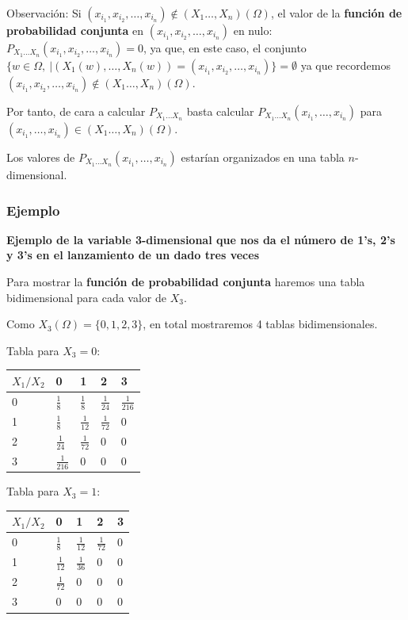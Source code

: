 \documentclass[]{book}
\begin{document}
Observación:
Si \((x_{i_1},x_{i_2},\ldots,x_{i_n})\not\in (X_1\ldots,X_n)(\Omega)\), el valor de la \textbf{función de probabilidad conjunta} en \((x_{i_1},x_{i_2},\ldots,x_{i_n})\) en nulo: \(P_{X_1\ldots X_n}(x_{i_1},x_{i_2},\ldots,x_{i_n})=0\), ya que, en este caso, el conjunto \(\{w\in\Omega,\ | (X_1(w),\ldots,X_n(w))=(x_{i_1},x_{i_2},\ldots,x_{i_n})\}=\emptyset\) ya que recordemos \((x_{i_1},x_{i_2},\ldots,x_{i_n})\not\in (X_1\ldots,X_n)(\Omega)\).

Por tanto, de cara a calcular \(P_{X_1\ldots X_n}\) basta calcular \(P_{X_1\ldots X_n}(x_{i_1},\ldots,x_{i_n})\) para \((x_{i_1},\ldots,x_{i_n})\in (X_1\ldots,X_n)(\Omega)\).

Los valores de \(P_{X_1\ldots X_n}(x_{i_1},\ldots,x_{i_n})\) estarían organizados en una tabla \(n\)-dimensional.

\hypertarget{ejemplo-1}{%
\subsubsection{Ejemplo}\label{ejemplo-1}}

\textbf{Ejemplo de la variable 3-dimensional que nos da el número de 1's, 2's y 3's en el lanzamiento de un dado tres veces}

Para mostrar la \textbf{función de probabilidad conjunta} haremos una tabla bidimensional para cada valor de \(X_3\).

Como \(X_3(\Omega)=\{0,1,2,3\}\), en total mostraremos 4 tablas bidimensionales.

Tabla para \(X_3=0\):

\begin{longtable}[]{@{}lllll@{}}
\toprule
\(X_1/X_2\) & 0 & 1 & 2 & 3\tabularnewline
\midrule
\endhead
0 & \(\frac{1}{8}\) & \(\frac{1}{8}\) & \(\frac{1}{24}\) & \(\frac{1}{216}\)\tabularnewline
1 & \(\frac{1}{8}\) & \(\frac{1}{12}\) & \(\frac{1}{72}\) & \(0\)\tabularnewline
2 & \(\frac{1}{24}\) & \(\frac{1}{72}\) & \(0\) & \(0\)\tabularnewline
3 & \(\frac{1}{216}\) & \(0\) & \(0\) & \(0\)\tabularnewline
\bottomrule
\end{longtable}

Tabla para \(X_3=1\):

\begin{longtable}[]{@{}lllll@{}}
\toprule
\(X_1/X_2\) & 0 & 1 & 2 & 3\tabularnewline
\midrule
\endhead
0 & \(\frac{1}{8}\) & \(\frac{1}{12}\) & \(\frac{1}{72}\) & \(0\)\tabularnewline
1 & \(\frac{1}{12}\) & \(\frac{1}{36}\) & \(0\) & \(0\)\tabularnewline
2 & \(\frac{1}{72}\) & \(0\) & \(0\) & \(0\)\tabularnewline
3 & \(0\) & \(0\) & \(0\) & \(0\)\tabularnewline
\bottomrule
\end{longtable}
\end{document}
